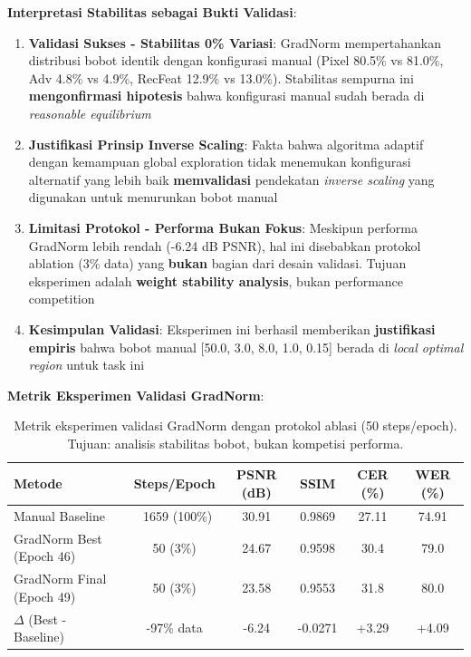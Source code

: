 \documentclass[12pt,a4paper]{article}
\begin{document}
\textbf{Interpretasi Stabilitas sebagai Bukti Validasi}:
\begin{enumerate}[leftmargin=*]
    \item \textbf{Validasi Sukses - Stabilitas 0\% Variasi}: GradNorm mempertahankan distribusi bobot identik dengan konfigurasi manual (Pixel 80.5\% vs 81.0\%, Adv 4.8\% vs 4.9\%, RecFeat 12.9\% vs 13.0\%). Stabilitas sempurna ini \textbf{mengonfirmasi hipotesis} bahwa konfigurasi manual sudah berada di \textit{reasonable equilibrium}
    \item \textbf{Justifikasi Prinsip Inverse Scaling}: Fakta bahwa algoritma adaptif dengan kemampuan global exploration tidak menemukan konfigurasi alternatif yang lebih baik \textbf{memvalidasi} pendekatan \textit{inverse scaling} yang digunakan untuk menurunkan bobot manual
    \item \textbf{Limitasi Protokol - Performa Bukan Fokus}: Meskipun performa GradNorm lebih rendah (-6.24 dB PSNR), hal ini disebabkan protokol ablation (3\% data) yang \textbf{bukan} bagian dari desain validasi. Tujuan eksperimen adalah \textbf{weight stability analysis}, bukan performance competition
    \item \textbf{Kesimpulan Validasi}: Eksperimen ini berhasil memberikan \textbf{justifikasi empiris} bahwa bobot manual [50.0, 3.0, 8.0, 1.0, 0.15] berada di \textit{local optimal region} untuk task ini
\end{enumerate}

\textbf{Metrik Eksperimen Validasi GradNorm}:

\begin{table}[H]
\centering
\caption{Metrik eksperimen validasi GradNorm dengan protokol ablasi (50 steps/epoch). Tujuan: analisis stabilitas bobot, bukan kompetisi performa.}
\label{tab:gradnorm-vs-baseline}
\small
\begin{tabular}{lccccc}
\hline
\textbf{Metode} & \textbf{Steps/Epoch} & \textbf{PSNR (dB)} & \textbf{SSIM} & \textbf{CER (\%)} & \textbf{WER (\%)} \\
\hline
Manual Baseline & ~1659 (100\%) & 30.91 & 0.9869 & 27.11 & 74.91 \\
GradNorm Best (Epoch 46) & 50 (3\%) & 24.67 & 0.9598 & 30.4 & 79.0 \\
GradNorm Final (Epoch 49) & 50 (3\%) & 23.58 & 0.9553 & 31.8 & 80.0 \\
$\Delta$ (Best - Baseline) & -97\% data & -6.24 & -0.0271 & +3.29 & +4.09 \\
\hline
\end{tabular}
\end{table}
\end{document}
